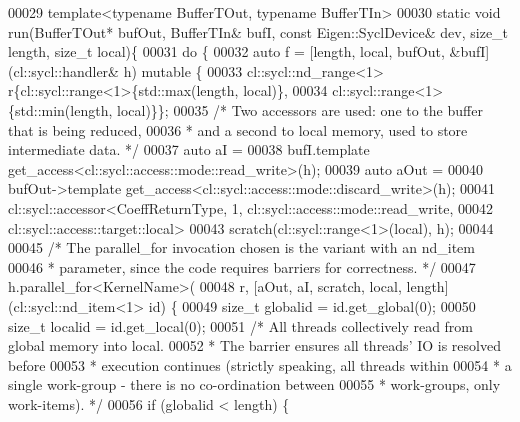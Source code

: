 \begin{DoxyCode}
00029 \textcolor{keyword}{template}<\textcolor{keyword}{typename} BufferTOut, \textcolor{keyword}{typename} BufferTIn>
00030 \textcolor{keyword}{static} \textcolor{keywordtype}{void} run(BufferTOut* bufOut, BufferTIn& bufI, \textcolor{keyword}{const} Eigen::SyclDevice& dev, \textcolor{keywordtype}{size\_t} length, \textcolor{keywordtype}{size\_t} 
      local)\{
00031   \textcolor{keywordflow}{do} \{
00032           \textcolor{keyword}{auto} f = [length, local, bufOut, &bufI](cl::sycl::handler& h) \textcolor{keyword}{mutable} \{
00033             cl::sycl::nd\_range<1> r\{cl::sycl::range<1>\{std::max(length, local)\},
00034                                     cl::sycl::range<1>\{std::min(length, local)\}\};
00035             \textcolor{comment}{/* Two accessors are used: one to the buffer that is being reduced,}
00036 \textcolor{comment}{             * and a second to local memory, used to store intermediate data. */}
00037             \textcolor{keyword}{auto} aI =
00038                 bufI.template get\_access<cl::sycl::access::mode::read\_write>(h);
00039             \textcolor{keyword}{auto} aOut =
00040                 bufOut->template get\_access<cl::sycl::access::mode::discard\_write>(h);
00041             cl::sycl::accessor<CoeffReturnType, 1, cl::sycl::access::mode::read\_write,
00042                                cl::sycl::access::target::local>
00043                 scratch(cl::sycl::range<1>(local), h);
00044 
00045             \textcolor{comment}{/* The parallel\_for invocation chosen is the variant with an nd\_item}
00046 \textcolor{comment}{             * parameter, since the code requires barriers for correctness. */}
00047             h.parallel\_for<KernelName>(
00048                 r, [aOut, aI, scratch, local, length](cl::sycl::nd\_item<1> id) \{
00049                   \textcolor{keywordtype}{size\_t} globalid = \textcolor{keywordtype}{id}.get\_global(0);
00050                   \textcolor{keywordtype}{size\_t} localid = \textcolor{keywordtype}{id}.get\_local(0);
00051                   \textcolor{comment}{/* All threads collectively read from global memory into local.}
00052 \textcolor{comment}{                   * The barrier ensures all threads' IO is resolved before}
00053 \textcolor{comment}{                   * execution continues (strictly speaking, all threads within}
00054 \textcolor{comment}{                   * a single work-group - there is no co-ordination between}
00055 \textcolor{comment}{                   * work-groups, only work-items). */}
00056                   \textcolor{keywordflow}{if} (globalid < length) \{

\end{DoxyCode}
